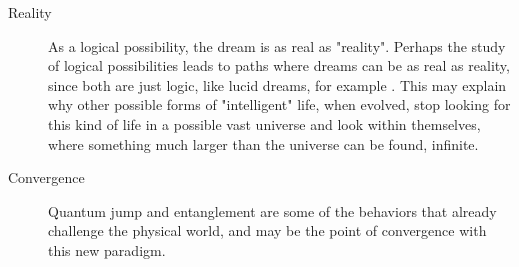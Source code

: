 \begin{description}
	   \item[Reality] As a logical possibility, the dream is as real as "reality". Perhaps the study of logical possibilities leads to paths where dreams can be as real as reality, since both are just logic, like lucid dreams, for example \cite{lucid_dreams}.  This may explain why other possible forms of "intelligent" life, when evolved, stop looking for this kind of life in a possible vast universe and look within themselves, where something much larger than the universe can be found, infinite.
	   \item[Convergence] Quantum jump and entanglement are some of the behaviors that already challenge the physical world, and may be the point of convergence with this new paradigm.
	\end{description}
